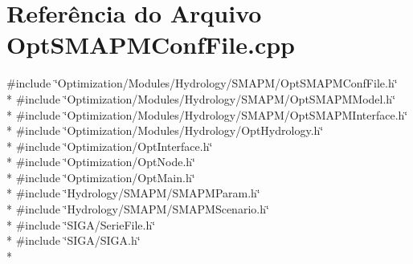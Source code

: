\section{Referência do Arquivo Opt\+S\+M\+A\+P\+M\+Conf\+File.\+cpp}
\label{_opt_s_m_a_p_m_conf_file_8cpp}
{\ttfamily \#include \char`\"{}Optimization/\+Modules/\+Hydrology/\+S\+M\+A\+P\+M/\+Opt\+S\+M\+A\+P\+M\+Conf\+File.\+h\char`\"{}}\\*
{\ttfamily \#include \char`\"{}Optimization/\+Modules/\+Hydrology/\+S\+M\+A\+P\+M/\+Opt\+S\+M\+A\+P\+M\+Model.\+h\char`\"{}}\\*
{\ttfamily \#include \char`\"{}Optimization/\+Modules/\+Hydrology/\+S\+M\+A\+P\+M/\+Opt\+S\+M\+A\+P\+M\+Interface.\+h\char`\"{}}\\*
{\ttfamily \#include \char`\"{}Optimization/\+Modules/\+Hydrology/\+Opt\+Hydrology.\+h\char`\"{}}\\*
{\ttfamily \#include \char`\"{}Optimization/\+Opt\+Interface.\+h\char`\"{}}\\*
{\ttfamily \#include \char`\"{}Optimization/\+Opt\+Node.\+h\char`\"{}}\\*
{\ttfamily \#include \char`\"{}Optimization/\+Opt\+Main.\+h\char`\"{}}\\*
{\ttfamily \#include \char`\"{}Hydrology/\+S\+M\+A\+P\+M/\+S\+M\+A\+P\+M\+Param.\+h\char`\"{}}\\*
{\ttfamily \#include \char`\"{}Hydrology/\+S\+M\+A\+P\+M/\+S\+M\+A\+P\+M\+Scenario.\+h\char`\"{}}\\*
{\ttfamily \#include \char`\"{}S\+I\+G\+A/\+Serie\+File.\+h\char`\"{}}\\*
{\ttfamily \#include \char`\"{}S\+I\+G\+A/\+S\+I\+G\+A.\+h\char`\"{}}\\*
